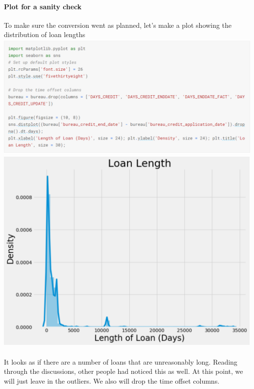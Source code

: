 \documentclass[twoside,a4paper]{article}
\begin{document}
\paragraph{Plot for a sanity check}
To make sure the conversion went as planned, let's make a plot showing the distribution of loan lengths\\
\includegraphics[scale=.8]{load8.png}
\includegraphics[scale=.8]{load9.png}
\\\\It looks as if there are a number of loans that are unreasonably long. Reading through the discussions, other people had noticed this as well. At this point, we will just leave in the outliers. We also will drop the time offset columns.\\\\
\end{document}
